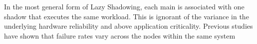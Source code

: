 In the most general form of Lazy Shadowing, each main is associated with one shadow that executes the same workload. This is ignorant of the variance in the underlying hardware reliability and above application criticality. Previous studies have shown that failure rates vary across the nodes within the same system